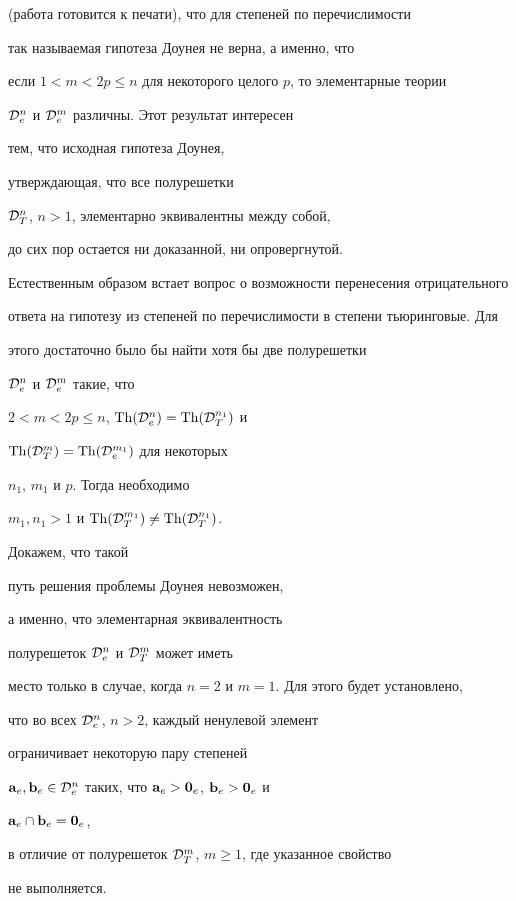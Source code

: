(работа готовится к печати), что для степеней по перечислимости


так называемая гипотеза Доунея не верна, а именно, что


если $1<m<2p\le n$ для некоторого целого $p$, то элементарные теории


${\cal D}_e^{n}$ и ${\cal D}_e^{m}$ различны. Этот результат интересен


тем, что исходная гипотеза Доунея,


утверждающая, что все полурешетки


${\cal D}_T^{n}$, $n>1$, элементарно эквивалентны между собой,


до сих пор остается ни доказанной, ни опровергнутой.


Естественным образом встает вопрос о возможности перенесения отрицательного


ответа на гипотезу из степеней по перечислимости в степени тьюринговые. Для 


этого достаточно было бы найти хотя бы две полурешетки


${\cal D}_e^{n}$ и ${\cal D}_e^{m}$ такие, что


$2<m<2p\le n$, $\operatorname{Th}({\cal D}_e^{n})=\operatorname{Th}({\cal D}_T^{n_1})$ и


$\operatorname{Th}({\cal D}_T^{m})=\operatorname{Th}({\cal D}_e^{m_1})$ для некоторых


$n_1$, $m_1$ и $p$. Тогда необходимо


$m_1, n_1>1$ и $\operatorname{Th}({{\cal D}_T^{m_1}})\ne\operatorname{Th}({\cal D}_T^{n_1})$.





Докажем, что такой


путь решения проблемы Доунея невозможен,


а именно, что элементарная эквивалентность


полурешеток ${\cal D}_e^{n}$ и ${\cal D}_T^{m}$ может иметь


место только в случае, когда $n=2$ и $m=1$. Для этого будет установлено,


что во всех ${\cal D}_e^{n}$, $n>2$, каждый ненулевой элемент


ограничивает некоторую пару степеней


${\bold a}_e, {\bold b}_e\in{\cal D}_e^{n}$ таких, что ${\bold a}_e>{\bold 0}_e$, ${\bold b}_e>{\bold 0}_e$ и 


${\bold a}_e\cap{\bold b}_e={\bold 0}_e$,


в отличие от полурешеток ${\cal D}_T^{m}$, $m\ge 1$, где указанное свойство


не выполняется. 





